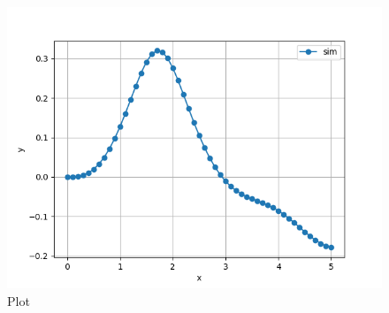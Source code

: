 \documentclass[journal]{IEEEtran}
\begin{document}
\begin{figure}[h!]
   \centering
   \includegraphics[width=1\columnwidth]{Figs/Figure_1.png}
   \caption{Plot}
\end{figure}
\end{document}
